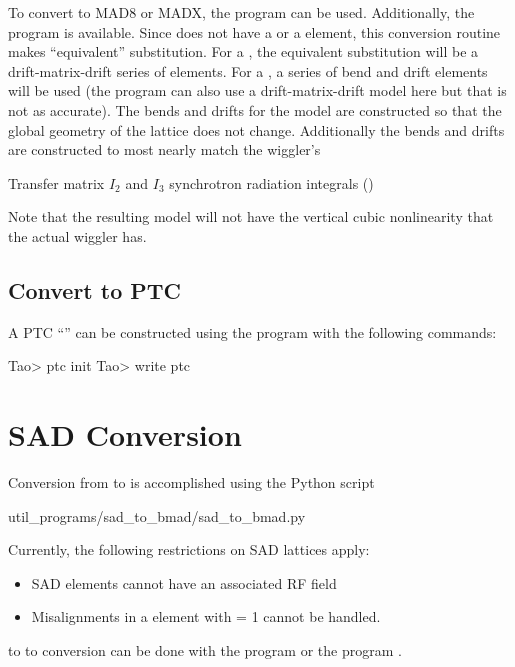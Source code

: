To convert to MAD8 or MADX, the \tao program can be used. Additionally, the program
 is available. Since \mad does not have a  or a
 element, this conversion routine makes ``equivalent'' substitution. For a
, the equivalent substitution will be a drift-matrix-drift series of elements. For a
, a series of bend and drift elements will be used (the program can also use a
drift-matrix-drift model here but that is not as accurate). The bends and drifts for the
 model are constructed so that the global geometry of the lattice does not
change. Additionally the bends and drifts are constructed to most nearly match the wiggler's
\begin{example}
  Transfer matrix
  $I_2$ and $I_3$ synchrotron radiation integrals ()
\end{example}
Note that the resulting model will not have the vertical cubic nonlinearity that the actual wiggler
has.

\subsection{Convert to PTC}
\label{s:to.ptc}

A PTC ``'' can be constructed using the \tao program with the following commands:
\begin{example}
  Tao> ptc init
  Tao> write ptc
\end{example}

\section{SAD Conversion}
\label{s:sad.convert}

Conversion from \cite{b:sad} to \bmad is accomplished using the Python script
\begin{example}
  util_programs/sad_to_bmad/sad_to_bmad.py
\end{example}
Currently, the following restrictions on SAD lattices apply:
  \begin{itemize}
  \item
SAD  elements cannot have an associated RF field
  \item
Misalignments in a  element with  = 1 cannot be handled.
  \end{itemize}

\bmad to  to conversion can be done with the \tao program or the program 
.
